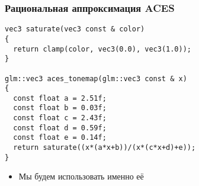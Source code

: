 \documentclass[10pt]{beamer}
\begin{document}
\begin{frame}[fragile]
\frametitle{Рациональная аппроксимация ACES}
\begin{verbatim}
vec3 saturate(vec3 const & color)
{
  return clamp(color, vec3(0.0), vec3(1.0));
}

glm::vec3 aces_tonemap(glm::vec3 const & x)
{
  const float a = 2.51f;
  const float b = 0.03f;
  const float c = 2.43f;
  const float d = 0.59f;
  const float e = 0.14f;
  return saturate((x*(a*x+b))/(x*(c*x+d)+e));
}
\end{verbatim}
\pause
\begin{itemize}
\item Мы будем использовать именно её
\end{itemize}
\end{frame}
\end{document}
